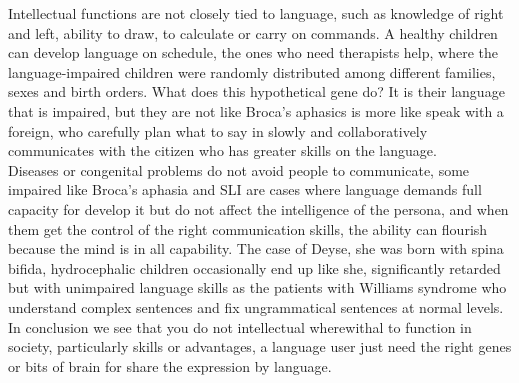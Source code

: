 \documentclass[13pt,letterpaper,onecolumn]{report}
\begin{document}
\hspace{1em} Intellectual functions are not closely tied to language, such as knowledge of right and left, ability to draw, to calculate or carry on commands. A healthy children can develop language on schedule, the ones who need therapists help, where the language-impaired children were randomly distributed among different families, sexes and birth orders. What does this hypothetical gene do? It is their language that is impaired, but they are not like Broca’s aphasics is more like speak with a foreign, who carefully plan what to say in slowly and collaboratively communicates with the citizen who has greater skills on the language.\\
\hspace{1em} Diseases or congenital problems do not avoid people to communicate, some impaired like Broca’s aphasia and SLI are cases where language demands full capacity for develop it but do not affect the intelligence of the persona, and when them get the control of the right communication skills, the ability can flourish because the mind is in all capability. The case of Deyse, she was born with spina bifida, hydrocephalic children occasionally end up like she, significantly retarded but with unimpaired language skills as the patients with Williams syndrome who understand complex sentences and fix ungrammatical sentences at normal levels.\\

\hspace{1em} In conclusion we see that you do not intellectual wherewithal to function in society, particularly skills or advantages, a language user just need the right genes or bits of brain for share the expression by language.
\end{document}
